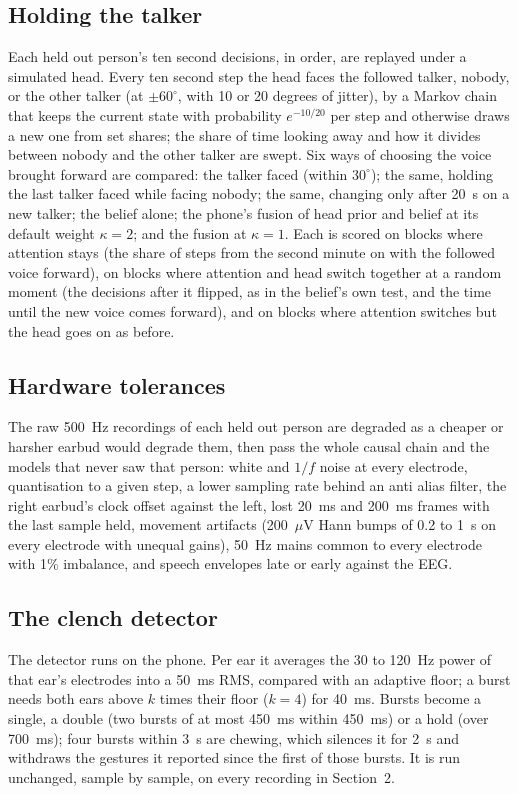 \documentclass[11pt]{article}
\begin{document}
\subsection{Holding the talker}
Each held out person's ten second decisions, in order, are replayed under a simulated head. Every ten second step the head faces the followed talker, nobody, or the other talker (at $\pm60^\circ$, with 10 or 20 degrees of jitter), by a Markov chain that keeps the current state with probability $e^{-10/20}$ per step and otherwise draws a new one from set shares; the share of time looking away and how it divides between nobody and the other talker are swept. Six ways of choosing the voice brought forward are compared: the talker faced (within $30^\circ$); the same, holding the last talker faced while facing nobody; the same, changing only after 20~s on a new talker; the belief alone; the phone's fusion of head prior and belief at its default weight $\kappa=2$; and the fusion at $\kappa=1$. Each is scored on blocks where attention stays (the share of steps from the second minute on with the followed voice forward), on blocks where attention and head switch together at a random moment (the decisions after it flipped, as in the belief's own test, and the time until the new voice comes forward), and on blocks where attention switches but the head goes on as before.

\subsection{Hardware tolerances}
The raw 500~Hz recordings of each held out person are degraded as a cheaper or harsher earbud would degrade them, then pass the whole causal chain and the models that never saw that person: white and $1/f$ noise at every electrode, quantisation to a given step, a lower sampling rate behind an anti alias filter, the right earbud's clock offset against the left, lost 20~ms and 200~ms frames with the last sample held, movement artifacts (200~$\mu$V Hann bumps of 0.2 to 1~s on every electrode with unequal gains), 50~Hz mains common to every electrode with 1\% imbalance, and speech envelopes late or early against the EEG.

\subsection{The clench detector}
The detector runs on the phone. Per ear it averages the 30 to 120~Hz power of that ear's electrodes into a 50~ms RMS, compared with an adaptive floor; a burst needs both ears above $k$ times their floor ($k=4$) for 40~ms. Bursts become a single, a double (two bursts of at most 450~ms within 450~ms) or a hold (over 700~ms); four bursts within 3~s are chewing, which silences it for 2~s and withdraws the gestures it reported since the first of those bursts. It is run unchanged, sample by sample, on every recording in Section~2.
\end{document}
